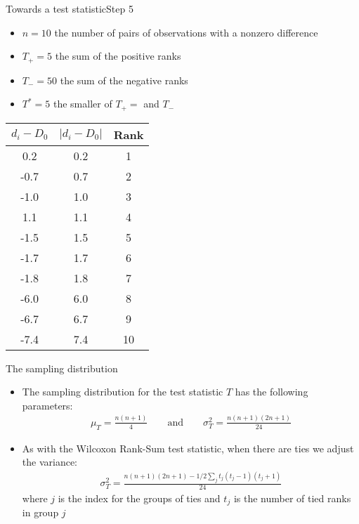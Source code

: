 \documentclass[xcolor=dvipsnames]{beamer}
\begin{document}
\begin{frame}{Towards a test statistic}{Step 5}
\begin{itemize}
	\item $n = 10$ the number of pairs of observations with a nonzero difference
	\item $T_+ = 5$  the sum of the positive ranks
	\item $T_- = 50$ the sum of the negative ranks
	\item $T^* = 5$ the smaller of $T_+ = $ and $T_-$ 
\end{itemize}
{\tiny
\begin{center}
	\begin{tabular}{|c|c|c|}
		\hline
		$d_i -D_0$ & \textbf{$|d_i - D_0|$} &  \textbf{Rank}  \\ \hline \hline
		0.2 & 0.2 &     1\\ \hline
		-0.7  &0.7  &    2\\ \hline
		-1.0  &1.0  &    3\\ \hline
		1.1  & 1.1  &    4\\ \hline
		-1.5  & 1.5  &    5\\ \hline
		-1.7  &1.7  &    6\\ \hline
		-1.8  & 1.8  &    7\\ \hline
		-6.0  & 6.0  &    8\\ \hline
		-6.7  & 6.7  &    9\\ \hline
		-7.4  &7.4  &   10\\ \hline
	\end{tabular}
\end{center}}
\end{frame}

\begin{frame}{The sampling distribution}
	\begin{itemize}
		\item The sampling distribution for the test statistic $T$ has the following parameters:
		\begin{gather*}
			\mu_{T} = \frac{n (n+1)}{4} \quad \quad \text{and} \quad \quad \sigma_{T}^2 = \frac{n(n+1)(2n+1)}{24}
		\end{gather*}
		\item As with the Wilcoxon Rank-Sum test statistic, when there are ties we adjust the variance:
		\begin{gather*}
			\sigma_{T}^2 = \frac{n(n+1)(2n+1)-1/2 \sum_j t_j (t_j-1)(t_j+1)}{24}
		\end{gather*}
		where $j$ is the index for the groups of ties and $t_j$ is the number of tied ranks in group $j$
	\end{itemize}
\end{frame}
\end{document}
